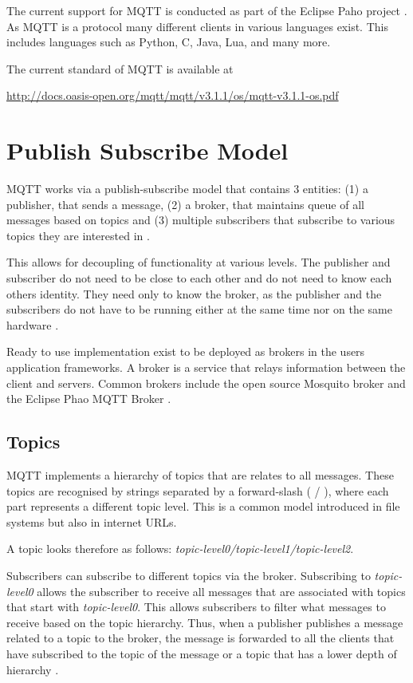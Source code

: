 The current support for MQTT is conducted as part of the Eclipse Paho
project \cite{eclipse-mosquitto}.  As MQTT is a protocol many
different clients in various languages exist.  This includes languages
such as Python, C, Java, Lua, and many more.

The current standard of MQTT is available at 

\url{http://docs.oasis-open.org/mqtt/mqtt/v3.1.1/os/mqtt-v3.1.1-os.pdf}

\section{Publish Subscribe Model}

MQTT works via a publish-subscribe model that contains 3 entities: (1) a
publisher, that sends a message, (2) a broker, that maintains queue of all
messages based on topics and (3) multiple subscribers that subscribe to
various topics they are interested in \cite{how-mqtt-works}.

This allows for decoupling of functionality at various levels. The
publisher and subscriber do not need to be close to each other and do
not need to know each others identity. They need only to know the
broker, as the publisher and the subscribers do not have to be running
either at the same time nor on the same hardware
\cite{hivemq-details}.

Ready to use implementation exist to be deployed as brokers in the
users application frameworks. A broker is a service that relays
information between the client and servers. Common brokers include the
open source Mosquito broker \cite{mqtt-official} and the Eclipse Phao
MQTT Broker \cite{eclipse-mosquitto}.


\subsection{Topics}

MQTT implements a hierarchy of topics that are relates
to all messages. These topics are recognised by strings separated by a
forward-slash ( / ), where each part represents a different topic
level. This is a common model introduced in file systems but also in
internet URLs. 

A topic looks therefore as follows: {\em topic-level0/topic-level1/topic-level2}.



Subscribers can subscribe to different topics via the broker.
Subscribing to {\em topic-level0} allows the subscriber to receive all
messages that are associated with topics that start with {\em
  topic-level0}. This allows subscribers to filter what messages to
receive based on the topic hierarchy. Thus, when a publisher publishes
a message related to a topic to the broker, the message is forwarded
to all the clients that have subscribed to the topic of the message or
a topic that has a lower depth of hierarchy \cite{hivemq-details}
\cite{how-mqtt-works}.

